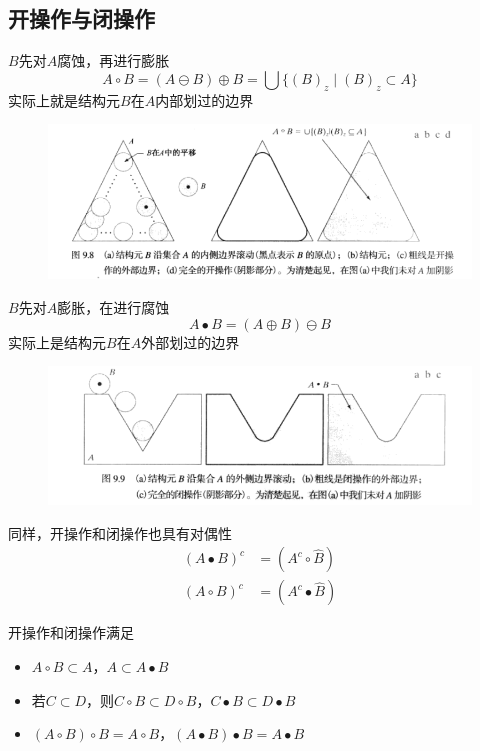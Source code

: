 \subsection{开操作与闭操作}
\begin{definition}[开操作]
$B$先对$A$腐蚀，再进行膨胀
\[A\circ B=(A\ominus B)\oplus B=\bigcup\{(B)_z\mid (B)_z\subset A\}\]
实际上就是结构元$B$在$A$内部划过的边界
\begin{figure}[H]
\centering
\includegraphics[width=0.9\linewidth]{fig/opening.png}
\end{figure}
\end{definition}
\begin{definition}[闭操作]
$B$先对$A$膨胀，在进行腐蚀
\[A\bullet B=(A\oplus B)\ominus B\]
实际上是结构元$B$在$A$外部划过的边界
\begin{figure}[H]
\centering
\includegraphics[width=0.9\linewidth]{fig/closing.png}
\end{figure}
\end{definition}

同样，开操作和闭操作也具有对偶性
\[\begin{aligned}
(A\bullet B)^c &= (A^c\circ\hat{B})\\
(A\circ B)^c &= (A^c\bullet\hat{B})
\end{aligned}\]

开操作和闭操作满足
\begin{itemize}
	\item $A\circ B\subset A$，$A\subset A\bullet B$
	\item 若$C\subset D$，则$C\circ B\subset D\circ B$，$C\bullet B\subset D\bullet B$
	\item $(A\circ B)\circ B=A\circ B$，$(A\bullet B)\bullet B=A\bullet B$
\end{itemize}

